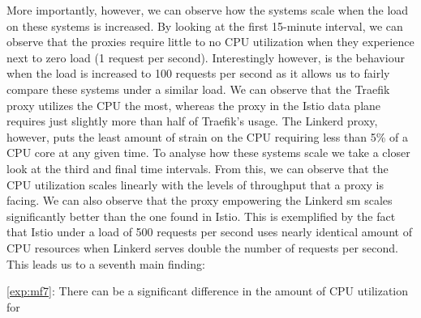 More importantly, however, we can observe how the systems scale when the load on these systems is increased. By looking at the first 15-minute interval, we can observe that the proxies require little to no CPU utilization when they experience next to zero load (1 request per second). Interestingly however, is the behaviour when the load is increased to 100 requests per second as it allows us to fairly compare these systems under a similar load. We can observe that the Traefik proxy utilizes the CPU the most, whereas the proxy in the Istio data plane requires just slightly more than half of Traefik's usage. The Linkerd proxy, however, puts the least amount of strain on the CPU requiring less than 5\% of a CPU core at any given time. To analyse how these systems scale we take a closer look at the third and final time intervals. From this, we can observe that the CPU utilization scales linearly with the levels of throughput that a proxy is facing. We can also observe that the proxy empowering the Linkerd \gls{sm} scales significantly better than the one found in Istio. This is exemplified by the fact that Istio under a load of 500 requests per second uses nearly identical amount of CPU resources when Linkerd serves double the number of requests per second. This leads us to a seventh main finding:

\begin{shaded*}
    \noindent
    \ref{exp:mf7}: 
    There can be a significant difference in the amount of CPU utilization for 
\end{shaded*}
